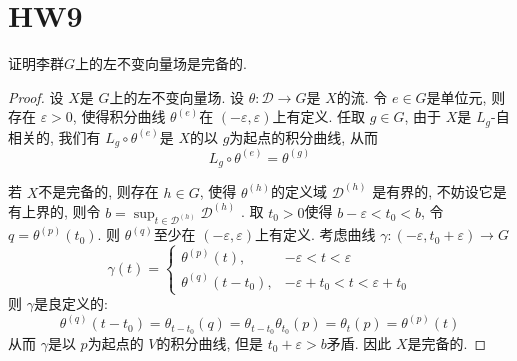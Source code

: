 \documentclass[../main.tex]{subfiles}
\begin{document}
\ifSubfilesClassLoaded{

    
}{}

\chapter{ HW9 }
\begin{exercise}{}{}
证明李群\(G\)上的左不变向量场是完备的.
\end{exercise}

\begin{proof}
    设 \(  X  \)是 \(  G  \)上的左不变向量场. 设 \(   \theta : \mathcal{D}\to G  \)是 \(  X  \)的流. 令 \(  e\in G  \)是单位元, 则存在 \(   \varepsilon > 0  \), 使得积分曲线 \(   \theta ^{\left( e \right) }  \)在 \(  \left( - \varepsilon , \varepsilon  \right)   \)上有定义.    任取 \(  g\in G  \), 由于 \(  X  \)是 \(  L_{g}  \)-自相关的, 我们有 \(  L_{g}\circ  \theta ^{\left( e \right) }  \)是 \(  X  \)的以 \(  g  \)为起点的积分曲线, 从而 \[
    L_{g}\circ \theta ^{\left( e \right) }=  \theta ^{\left( g \right) }
    \] 
    
    若 \(  X  \)不是完备的, 则存在 \(  h\in G  \), 使得 \(   \theta ^{\left( h \right) }  \)的定义域 \(  \mathcal{D}^{\left( h \right) }  \)    是有界的, 不妨设它是有上界的, 则令 \(  b= \sup _{t\in \mathcal{D}^{\left( h \right) }}\mathcal{D}^{\left( h \right) }  \) . 取 \(  t_0  > 0\)使得 \(b- \varepsilon < t_0< b  \), 令 \(  q=  \theta ^{\left( p \right) }\left( t_0 \right)   \). 则 \(   \theta ^{\left( q \right) }  \)至少在 \(  \left( - \varepsilon , \varepsilon  \right)   \)上有定义. 考虑曲线 \(   \gamma :\left( - \varepsilon ,t_0+  \varepsilon  \right)   \to G\) \[
     \gamma \left( t \right)= \begin{cases}  \theta ^{\left( p \right) }\left( t \right),& - \varepsilon < t<  \varepsilon \\ 
       \theta ^{\left( q \right) }\left( t-t_0 \right),& - \varepsilon + t_0< t<  \varepsilon + t_0   \end{cases}  
    \]    则 \(   \gamma   \)是良定义的: \[
     \theta ^{\left( q \right) }\left( t-t_0 \right)=  \theta _{t-t_0}\left( q \right)=  \theta _{t-t_0} \theta _{t_0}\left( p \right)=  \theta _{t}\left( p \right)=  \theta ^{\left( p \right) }\left( t \right)     
    \] 从而 \(   \gamma   \)是以 \(  p  \)为起点的 \(  V  \)的积分曲线, 但是 \(  t_0+  \varepsilon > b  \)矛盾.  因此 \(  X  \)是完备的.     
\end{proof}
\end{document}
